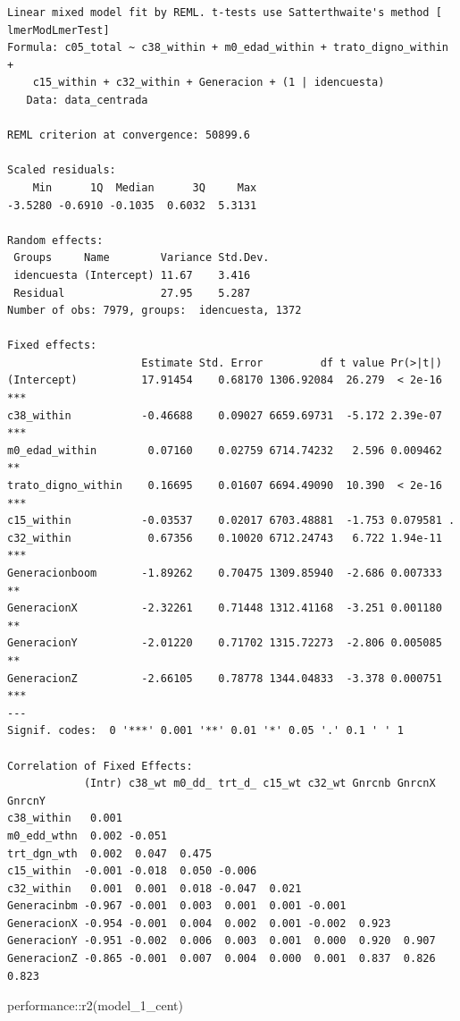 \documentclass[
  spanish,
  a4paper,
  oneside]{scrbook}
\newenvironment{Shaded}{\begin{snugshade}}{\end{snugshade}}
\newcommand{\FunctionTok}[1]{\textcolor[rgb]{0.28,0.35,0.67}{#1}}
\newcommand{\NormalTok}[1]{\textcolor[rgb]{0.00,0.23,0.31}{#1}}
\newcommand{\SpecialCharTok}[1]{\textcolor[rgb]{0.37,0.37,0.37}{#1}}
\begin{document}
\begin{verbatim}
Linear mixed model fit by REML. t-tests use Satterthwaite's method [
lmerModLmerTest]
Formula: c05_total ~ c38_within + m0_edad_within + trato_digno_within +  
    c15_within + c32_within + Generacion + (1 | idencuesta)
   Data: data_centrada

REML criterion at convergence: 50899.6

Scaled residuals: 
    Min      1Q  Median      3Q     Max 
-3.5280 -0.6910 -0.1035  0.6032  5.3131 

Random effects:
 Groups     Name        Variance Std.Dev.
 idencuesta (Intercept) 11.67    3.416   
 Residual               27.95    5.287   
Number of obs: 7979, groups:  idencuesta, 1372

Fixed effects:
                     Estimate Std. Error         df t value Pr(>|t|)    
(Intercept)          17.91454    0.68170 1306.92084  26.279  < 2e-16 ***
c38_within           -0.46688    0.09027 6659.69731  -5.172 2.39e-07 ***
m0_edad_within        0.07160    0.02759 6714.74232   2.596 0.009462 ** 
trato_digno_within    0.16695    0.01607 6694.49090  10.390  < 2e-16 ***
c15_within           -0.03537    0.02017 6703.48881  -1.753 0.079581 .  
c32_within            0.67356    0.10020 6712.24743   6.722 1.94e-11 ***
Generacionboom       -1.89262    0.70475 1309.85940  -2.686 0.007333 ** 
GeneracionX          -2.32261    0.71448 1312.41168  -3.251 0.001180 ** 
GeneracionY          -2.01220    0.71702 1315.72273  -2.806 0.005085 ** 
GeneracionZ          -2.66105    0.78778 1344.04833  -3.378 0.000751 ***
---
Signif. codes:  0 '***' 0.001 '**' 0.01 '*' 0.05 '.' 0.1 ' ' 1

Correlation of Fixed Effects:
            (Intr) c38_wt m0_dd_ trt_d_ c15_wt c32_wt Gnrcnb GnrcnX GnrcnY
c38_within   0.001                                                        
m0_edd_wthn  0.002 -0.051                                                 
trt_dgn_wth  0.002  0.047  0.475                                          
c15_within  -0.001 -0.018  0.050 -0.006                                   
c32_within   0.001  0.001  0.018 -0.047  0.021                            
Generacinbm -0.967 -0.001  0.003  0.001  0.001 -0.001                     
GeneracionX -0.954 -0.001  0.004  0.002  0.001 -0.002  0.923              
GeneracionY -0.951 -0.002  0.006  0.003  0.001  0.000  0.920  0.907       
GeneracionZ -0.865 -0.001  0.007  0.004  0.000  0.001  0.837  0.826  0.823
\end{verbatim}

\begin{Shaded}
\begin{Highlighting}[]
\NormalTok{performance}\SpecialCharTok{::}\FunctionTok{r2}\NormalTok{(model\_1\_cent)}
\end{Highlighting}
\end{Shaded}
\end{document}
